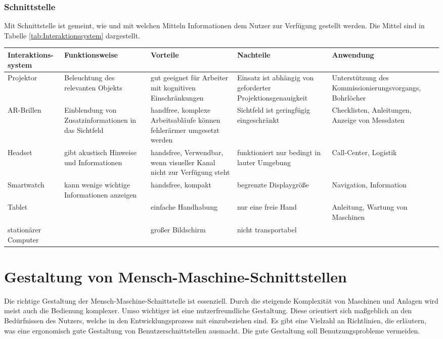 \subsubsection*{Schnittstelle}
Mit Schnittstelle ist gemeint, wie und mit welchen Mitteln Informationen dem Nutzer zur Verfügung gestellt werden. Die Mittel sind in Tabelle \ref{tab:Interaktionssystem} dargestellt.

\begin{sidewaystable}[ph!]
\begin{tabular}{p{}|p{}|p{}|p{}|p{}}
	\textbf{Interaktions-system} & \textbf{Funktionsweise} & \textbf{Vorteile} & \textbf{Nachteile} & \textbf{Anwendung} \\
	\hline
	Projektor & Beleuchtung des relevanten Objekts & gut geeignet für Arbeiter mit kognitiven Einschränkungen & Einsatz ist abhängig von geforderter Projektionsgenauigkeit & Unterstützung des Kommissionierungsvorgangs, Bohrlöcher \\
	\hline
	AR-Brillen & Einblendung von Zusatzinformationen in das Sichtfeld & handfree, komplexe Arbeitsabläufe können fehlerärmer umgesetzt werden & Sichtfeld ist geringfügig eingeschränkt & Checklisten, Anleitungen, Anzeige von Messdaten \\
	\hline
	Headset & gibt akustisch Hinweise und Informationen & handsfree, Verwendbar, wenn visueller Kanal nicht zur Verfügung steht & funktioniert nur bedingt in lauter Umgebung & Call-Center, Logistik \\
	\hline
	Smartwatch & kann wenige wichtige Informationen anzeigen & handsfree, kompakt & begrenzte Displaygröße & Navigation, Information \\
	\hline
	Tablet & & einfache Handhabung & nur eine freie Hand & Anleitung, Wartung von Maschinen\\
	\hline
	stationärer Computer & & großer Bildschirm & nicht transportabel & \\
\end{tabular}
\label{tab:Interaktionssystem}
\caption{Interaktionssysteme zur Bereitstellung von Informationen}
\end{sidewaystable}

\section{Gestaltung von Mensch-Maschine-Schnittstellen}
Die richtige Gestaltung der Mensch-Maschine-Schnittstelle ist essenziell. Durch die steigende Komplexität von Maschinen und Anlagen wird meist auch die Bedienung komplexer. Umso wichtiger ist eine nutzerfreundliche Gestaltung. Diese orientiert sich maßgeblich an den Bedürfnissen des Nutzers, welche in den Entwicklungsprozess mit einzubeziehen sind. Es gibt eine Vielzahl an Richtlinien, die erläutern, was eine ergonomisch gute Gestaltung von Benutzerschnittstellen ausmacht. Die gute Gestaltung soll Benutzungsprobleme vermeiden.

